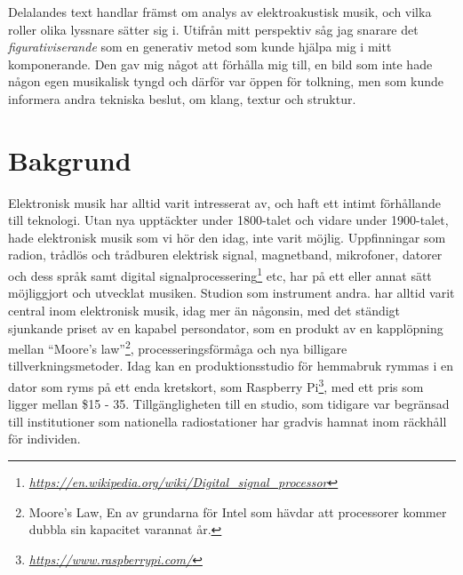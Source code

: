 \documentclass{article}
\begin{document}
Delalandes text handlar främst om analys av elektroakustisk musik, och vilka roller olika lyssnare sätter sig
i. Utifrån mitt perspektiv såg jag snarare det \emph{figurativiserande} som en generativ metod som kunde
hjälpa mig i mitt komponerande. Den gav mig något att förhålla mig till, en bild som inte hade någon egen
musikalisk tyngd och därför var öppen för tolkning, men som kunde informera andra tekniska beslut, om klang,
textur och struktur.





\section{Bakgrund}
Elektronisk musik har alltid varit intresserat av, och haft ett intimt förhållande till teknologi. Utan nya
upptäckter under 1800-talet och vidare under 1900-talet, hade elektronisk musik som vi hör den idag, inte
varit möjlig. Uppfinningar som radion, trådlös och trådburen elektrisk signal, magnetband, mikrofoner, datorer
och dess språk samt digital
signalprocessering\footnote{\emph{\url{https://en.wikipedia.org/wiki/Digital\_signal\_processor}}} etc, har på
ett eller annat sätt möjliggjort och utvecklat musiken. Studion som instrument %
andra. har alltid varit central inom elektronisk musik, idag mer än någonsin, med det ständigt sjunkande
priset av en kapabel persondator, som en produkt av en kapplöpning mellan ``Moore's law''\footnote{Moore's
Law, En av grundarna för Intel som hävdar att processorer kommer dubbla sin kapacitet varannat år.},
processeringsförmåga och nya billigare tillverkningsmetoder. Idag kan en produktionsstudio för hemmabruk
rymmas i en dator som ryms på ett enda kretskort, som Raspberry Pi\footnote{
\emph{\url{https://www.raspberrypi.com/}}}, med ett pris som ligger mellan \$15 - 35. Tillgängligheten till en
studio, som tidigare var begränsad till institutioner som nationella radiostationer har gradvis hamnat inom
räckhåll för individen.
\end{document}
